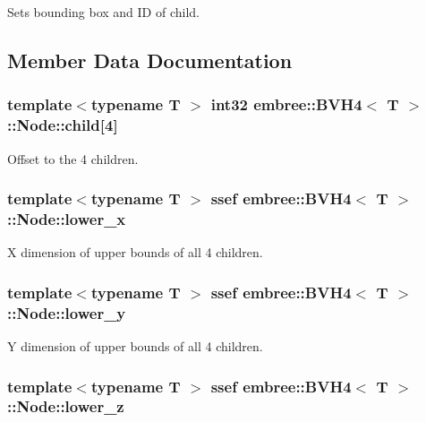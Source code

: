 Sets bounding box and ID of child. 



\subsection{Member Data Documentation}
\hypertarget{structembree_1_1_b_v_h4_1_1_node_a91f1fee63f300445c6abdc5c83205bb8}{
\subsubsection[{child}]{\setlength{\rightskip}{0pt plus 5cm}template$<$typename T $>$ int32 {\bf embree::BVH4}$<$ T $>$::{\bf Node::child}\mbox{[}4\mbox{]}}}
\label{structembree_1_1_b_v_h4_1_1_node_a91f1fee63f300445c6abdc5c83205bb8}


Offset to the 4 children. 

\hypertarget{structembree_1_1_b_v_h4_1_1_node_acd9383e7ba8258f434ff163257076dd4}{
\subsubsection[{lower\_\-x}]{\setlength{\rightskip}{0pt plus 5cm}template$<$typename T $>$ ssef {\bf embree::BVH4}$<$ T $>$::{\bf Node::lower\_\-x}}}
\label{structembree_1_1_b_v_h4_1_1_node_acd9383e7ba8258f434ff163257076dd4}


X dimension of upper bounds of all 4 children. 

\hypertarget{structembree_1_1_b_v_h4_1_1_node_a587ef15ee916db332c03dbd0f2ddbbec}{
\subsubsection[{lower\_\-y}]{\setlength{\rightskip}{0pt plus 5cm}template$<$typename T $>$ ssef {\bf embree::BVH4}$<$ T $>$::{\bf Node::lower\_\-y}}}
\label{structembree_1_1_b_v_h4_1_1_node_a587ef15ee916db332c03dbd0f2ddbbec}


Y dimension of upper bounds of all 4 children. 

\hypertarget{structembree_1_1_b_v_h4_1_1_node_a1e1de6851b49bddfceb9e791df303990}{
\subsubsection[{lower\_\-z}]{\setlength{\rightskip}{0pt plus 5cm}template$<$typename T $>$ ssef {\bf embree::BVH4}$<$ T $>$::{\bf Node::lower\_\-z}}}
\label{structembree_1_1_b_v_h4_1_1_node_a1e1de6851b49bddfceb9e791df303990}


